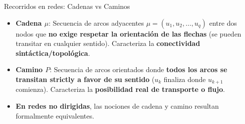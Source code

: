 \documentclass[
  ignorenonframetext,
]{beamer}
\providecommand{\tightlist}{%
  \setlength{\itemsep}{0pt}\setlength{\parskip}{0pt}}
\begin{document}
\begin{frame}{Recorridos en redes: Cadenas vs Caminos}
\label{recorridos-en-redes-cadenas-vs-caminos}
\begin{tcolorbox}[enhanced jigsaw, left=2mm, opacityback=0, titlerule=0mm, breakable, toptitle=1mm, rightrule=.15mm, bottomtitle=1mm, coltitle=black, title=\textcolor{quarto-callout-warning-color}{\faExclamationTriangle}\hspace{0.5em}{Diferencia conceptual fundamental}, colframe=quarto-callout-warning-color-frame, colbacktitle=quarto-callout-warning-color!10!white, arc=.35mm, toprule=.15mm, leftrule=.75mm, bottomrule=.15mm, opacitybacktitle=0.6, colback=white]

\begin{itemize}
\tightlist
\item
  \textbf{Cadena \(\mu\)}: Secuencia de arcos adyacentes
  \(\mu = (u_1, u_2, \dots, u_q)\) entre dos nodos que \textbf{no exige
  respetar la orientación de las flechas} (se pueden transitar en
  cualquier sentido). Caracteriza la \textbf{conectividad
  sintáctica/topológica}.
\item
  \textbf{Camino \(P\)}: Secuencia de arcos orientados donde
  \textbf{todos los arcos se transitan strictly a favor de su sentido}
  (\(u_k\) finaliza donde \(u_{k+1}\) comienza). Caracteriza la
  \textbf{posibilidad real de transporte o flujo}.
\item
  \textbf{En redes no dirigidas}, las nociones de cadena y camino
  resultan formalmente equivalentes.
\end{itemize}

\end{tcolorbox}
\end{frame}
\end{document}
